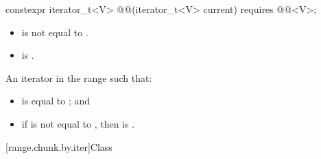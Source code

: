 %
\begin{itemdecl}
constexpr iterator_t<V> @@(iterator_t<V> current) requires @@<V>;
\end{itemdecl}

\begin{itemdescr}
\pnum
\expects
\begin{itemize}
\item
{} is not equal to .
\item
{} is .
\end{itemize}

\pnum
\returns
An iterator 
in the range  such that:
\begin{itemize}
\item
{} is equal to ; and
\item
if  is not equal to ,
then 
is .
\end{itemize}
\end{itemdescr}

[range.chunk.by.iter]{Class }

